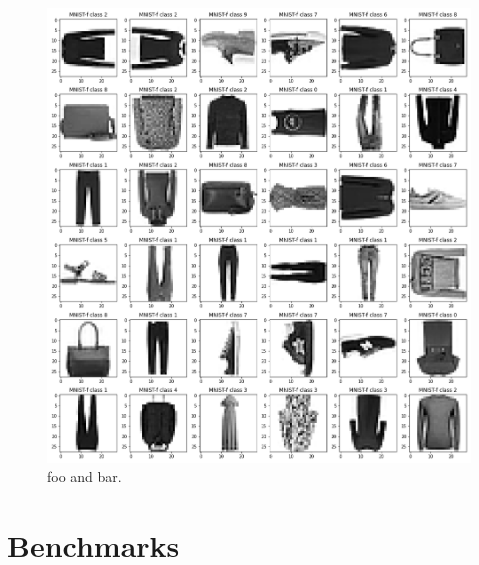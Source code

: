 \documentclass{article}
\begin{document}
\begin{figure}[tp]
\includegraphics[width=\textwidth]{../notebooks/MNIST-f.png}
\caption{foo and bar.\label{fig:f}}
\end{figure}

\section{Benchmarks}

\section{}
\end{document}
